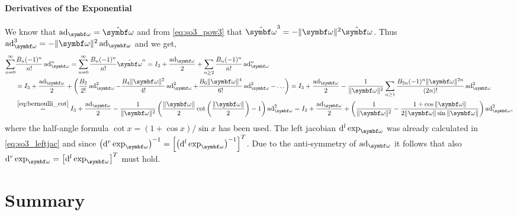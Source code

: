 \paragraph{Derivatives of the Exponential}

We know that $\ad_\bomega = \hat \bomega$ and from \eqref{eq:so3_pow3} that $\hat \bomega^3 = - \| \bomega \|^2 \hat \bomega$. Thus $\ad_\bomega^3 = -\| \bomega \|^2 \ad_\bomega$ and we get,
\begin{equation*}
  \begin{aligned}
    \sum_{n=0}^\infty
     &
    \frac{B_n (-1)^n}{n!} \ad_\bomega^n
    = \sum_{n=0}^\infty \frac{B_n (-1)^n}{n!} \hat \bomega^n = I_3 + \frac{\ad_\bomega}{2} + \sum_{n \geq 2} \frac{B_n (-1)^n}{n!}\ad_\bomega^n                                                                                                                                                                                                                    \\
     & = I_3 + \frac{\ad_\bomega}{2} + \left( \frac{B_2}{2!}\ad_\bomega^2 - \frac{B_4 \| \bomega \|^2} {4!} \ad_\bomega^2 + \frac{B_6 \| \bomega \|^4}{6!} \ad_\bomega^2 - \ldots \right) = I_3 + \frac{\ad_\bomega}{2} - \frac{1}{\| \bomega \|^2} \sum_{n \geq 1} \frac{B_{2n} (-1)^n \| \bomega \|^{2n}}{(2n)!} \ad_\bomega^2                                   \\
     & \overset{\eqref{eq:bernoulli_cot}}= I_3 + \frac{\ad_\bomega}{2} - \frac{1}{\| \bomega \|^2} \left( \frac{\| \bomega \|}{2} \cot \left( \frac{\| \bomega \|}{2} \right) - 1 \right) \ad_\bomega^2 = I_3 + \frac{\ad_\bomega}{2} + \left( \frac{1}{\| \bomega \|^2} - \frac{1 + \cos \| \bomega \| }{2 \|\bomega \| \sin \|\bomega \|} \right) \ad_\bomega^2,
  \end{aligned}
\end{equation*}
where the half-angle formula $\cot x = (1 + \cos x) / \sin x$ has been used. The left jacobian $\mathrm{d}^l \exp_\bomega$ was already calculated in \eqref{eq:so3_leftjac} and since $\left( \mathrm{d}^r \exp_{\bomega} \right)^{-1} = \left[ \left( \mathrm{d}^l \exp_{\bomega} \right)^{-1} \right]^T$. Due to the anti-symmetry of $\ad_\bomega$ it follows that also $\mathrm{d}^r \exp_\bomega = \left[ \mathrm{d}^l \exp_\bomega \right]^T$ must hold.


\section{Summary}


